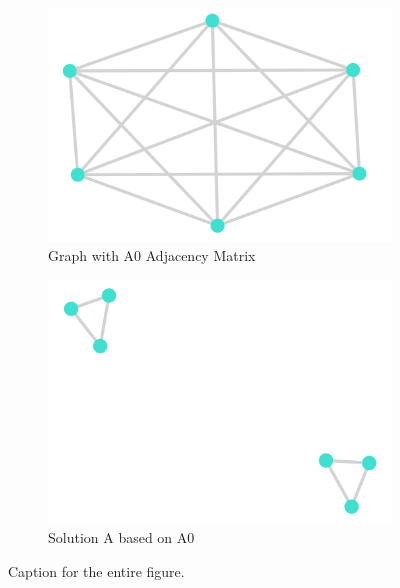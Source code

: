 \begin{figure}[h]
    \begin{subfigure}{0.5\textwidth}
        \centering
        \includegraphics[width=0.8\linewidth]{figures/A0.PNG}
        \caption{Graph with A0 Adjacency Matrix}
        \label{fig:sub1}
    \end{subfigure}%
    \begin{subfigure}{0.5\textwidth}
        \centering
        \includegraphics[width=0.8\linewidth]{figures/A.PNG}
        \caption{Solution A based on A0}
        \label{fig:sub2}
    \end{subfigure}
    \caption{Caption for the entire figure.}
    \label{fig:full}
\end{figure}


